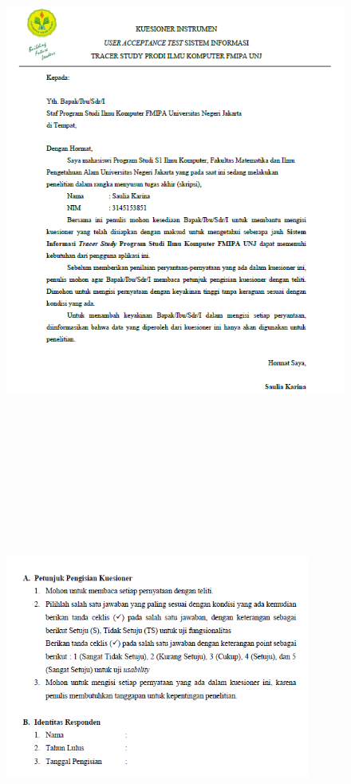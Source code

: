 \begin{figure}[H]
	\centering
	\includegraphics[width=15cm,height=18cm]{gambar/UAT/surat kuesioner}
	\label{surat_kuesioner}
\end{figure}

\begin{figure}[H]
	\centering
	\includegraphics[width=10cm,height=12cm]{gambar/UAT/surat kuesioner 2 alumni}
	\label{surat_kuesioner2}
\end{figure}

